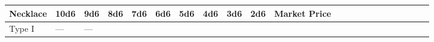 \begin{longtable}{llllllllllllllllllllll}
\hline
\multicolumn{1}{|p{0.534in}|}{\begin{minipage}[t]{0.534in}\raggedright
\textbf{Necklace}\end{minipage}} & \multicolumn{1}{p{0.341in}|}{\begin{minipage}[t]{0.341in}\centering
\textbf{10d6}\end{minipage}} & \multicolumn{1}{p{0.287in}|}{\begin{minipage}[t]{0.287in}\raggedright
\textbf{9d6}\end{minipage}} & \multicolumn{1}{p{0.287in}|}{\begin{minipage}[t]{0.287in}\raggedright
\textbf{8d6}\end{minipage}} & \multicolumn{1}{p{0.287in}|}{\begin{minipage}[t]{0.287in}\raggedright
\textbf{7d6}\end{minipage}} & \multicolumn{1}{p{0.287in}|}{\begin{minipage}[t]{0.287in}\raggedright
\textbf{6d6}\end{minipage}} & \multicolumn{1}{p{0.287in}|}{\begin{minipage}[t]{0.287in}\raggedright
\textbf{5d6}\end{minipage}} & \multicolumn{1}{p{0.287in}|}{\begin{minipage}[t]{0.287in}\raggedright
\textbf{4d6}\end{minipage}} & \multicolumn{1}{p{0.287in}|}{\begin{minipage}[t]{0.287in}\raggedright
\textbf{3d6}\end{minipage}} & \multicolumn{1}{p{0.287in}|}{\begin{minipage}[t]{0.287in}\raggedright
\textbf{2d6}\end{minipage}} & \multicolumn{1}{p{0.736in}|}{\begin{minipage}[t]{0.736in}\raggedleft
\textbf{Market Price}\end{minipage}}\\
\hline
\multicolumn{1}{p{0.054in}|}{\begin{minipage}[t]{0.054in}\raggedleft
Type I\end{minipage}} & \multicolumn{1}{p{0.054in}|}{\begin{minipage}[t]{0.054in}\centering
---\end{minipage}} & \multicolumn{1}{p{0.054in}|}{\begin{minipage}[t]{0.054in}\raggedright
---\end{minipage}} & \multicolumn{1}{p{0.054in}|}{\begin{minipage}[t]{0.054in}\raggedright

\end{minipage}}
\end{longtable}
